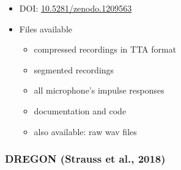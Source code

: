 \documentclass[14pt, oneside]{extarticle}
\begin{document}
\begin{itemize}
\item DOI: \href{https://zenodo.org/record/1209563}{10.5281/zenodo.1209563}

\item Files available
	\begin{itemize}
	\item compressed recordings in TTA format
	\item segmented recordings
	\item all microphone's impulse responses
	\item documentation and code
	\item also available: raw wav files
	\end{itemize}

\end{itemize}

\subsubsection{DREGON (Strauss et al., 2018)}
\end{document}
